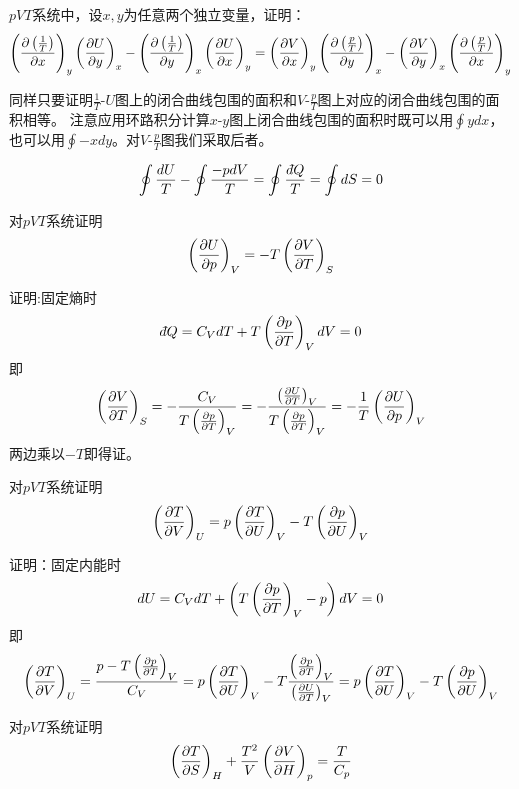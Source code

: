 \documentclass[CJK]{beamer}
\begin{document}
\begin{frame}
  \bch
  $pVT$系统中，设$x, y$为任意两个独立变量，证明：
      {\scriptsize $$ \pfrac {\left(\frac{1}{T}\right)}xy \pfrac Uyx - \pfrac {\left(\frac{1}{T}\right)}yx \pfrac Uxy = \pfrac Vxy \pfrac {\left(\frac{p}{T}\right)}yx - \pfrac Vyx \pfrac {\left(\frac{p}{T}\right)}xy $$}  
  \ech
\end{frame}

\begin{frame}
  \bch
  同样只要证明$\frac{1}{T}$-$U$图上的闭合曲线包围的面积和$V$-$\frac{p}{T}$图上对应的闭合曲线包围的面积相等。
  注意应用环路积分计算$x$-$y$图上闭合曲线包围的面积时既可以用$\oint ydx$，也可以用$\oint -x dy$。对$V$-$\frac{p}{T}$图我们采取后者。
  
  $$\oint \frac{dU}{T} - \oint \frac{-pdV}{T} = \oint \frac{\dbar Q}{T} = \oint dS = 0$$
  
  \ech
\end{frame}

\begin{frame}
  \bch
  对$pVT$系统证明
  $$\pfrac UpV = -T\pfrac VTS$$
  \ech
\end{frame}


\begin{frame}
  \bch
  证明:固定熵时
  $$ \dbar Q = C_V dT + T \pfrac pTV dV = 0 $$
  即
  $$ \pfrac VTS = -\frac{C_V}{T\pfrac pTV} = -\frac{\pfrac UTV}{T\pfrac pTV} = -\frac{1}{T} \pfrac UpV $$
  两边乘以$-T$即得证。
  \ech
\end{frame}

\begin{frame}
  \bch
  对$pVT$系统证明
  $$\pfrac TVU = p\pfrac TUV - T\pfrac pUV $$
  \ech
\end{frame}


\begin{frame}
  \bch
  证明：固定内能时
  $$ dU = C_V dT + \left(T\pfrac pTV - p\right)dV = 0$$
  即
  {\scriptsize
  $$ \pfrac TVU = \frac{p-T\pfrac pTV }{C_V} = p\pfrac TUV - T\frac{\pfrac pTV}{\pfrac UTV}  = p\pfrac TUV - T\pfrac pUV $$}
  \ech
\end{frame}

\begin{frame}
  \bch
  对$pVT$系统证明
  $$\pfrac TSH +\frac{T^2}{V} \pfrac VHp = \frac{T}{C_p} $$
  \ech
\end{frame}
\end{document}
